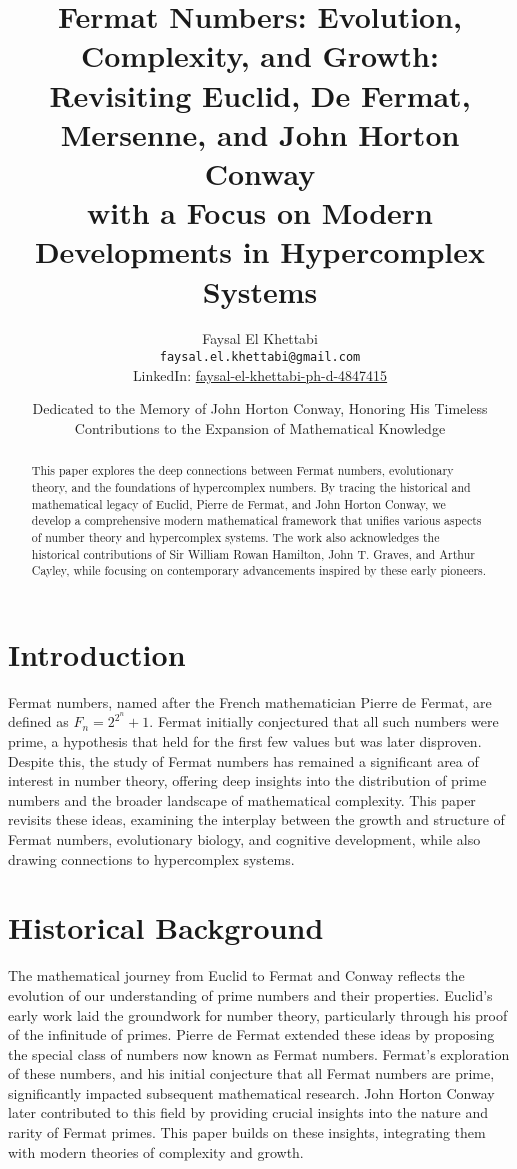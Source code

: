 \documentclass[12pt]{article}
\date{Dedicated to the Memory of John Horton Conway, Honoring His Timeless Contributions to the Expansion of Mathematical Knowledge}
\title{Fermat Numbers: Evolution, Complexity, and Growth:\\
Revisiting Euclid, De Fermat, Mersenne, and John Horton Conway \\
with a Focus on Modern Developments in Hypercomplex Systems}
\author{Faysal El Khettabi \\
\texttt{faysal.el.khettabi@gmail.com} \\
LinkedIn: \href{https://www.linkedin.com/in/faysal-el-khettabi-ph-d-4847415/}{faysal-el-khettabi-ph-d-4847415}
}
\begin{document}
\maketitle

\begin{abstract}
This paper explores the deep connections between Fermat numbers, evolutionary theory, and the foundations of hypercomplex numbers. By tracing the historical and mathematical legacy of Euclid, Pierre de Fermat, and John Horton Conway, we develop a comprehensive modern mathematical framework that unifies various aspects of number theory and hypercomplex systems. The work also acknowledges the historical contributions of Sir William Rowan Hamilton, John T. Graves, and Arthur Cayley, while focusing on contemporary advancements inspired by these early pioneers.
\end{abstract}

\section{Introduction}

Fermat numbers, named after the French mathematician Pierre de Fermat, are defined as \( F_n = 2^{2^n} + 1 \). Fermat initially conjectured that all such numbers were prime, a hypothesis that held for the first few values but was later disproven. Despite this, the study of Fermat numbers has remained a significant area of interest in number theory, offering deep insights into the distribution of prime numbers and the broader landscape of mathematical complexity. This paper revisits these ideas, examining the interplay between the growth and structure of Fermat numbers, evolutionary biology, and cognitive development, while also drawing connections to hypercomplex systems.

\section{Historical Background}

The mathematical journey from Euclid to Fermat and Conway reflects the evolution of our understanding of prime numbers and their properties. Euclid's early work laid the groundwork for number theory, particularly through his proof of the infinitude of primes. Pierre de Fermat extended these ideas by proposing the special class of numbers now known as Fermat numbers. Fermat's exploration of these numbers, and his initial conjecture that all Fermat numbers are prime, significantly impacted subsequent mathematical research. John Horton Conway later contributed to this field by providing crucial insights into the nature and rarity of Fermat primes. This paper builds on these insights, integrating them with modern theories of complexity and growth.
\end{document}
